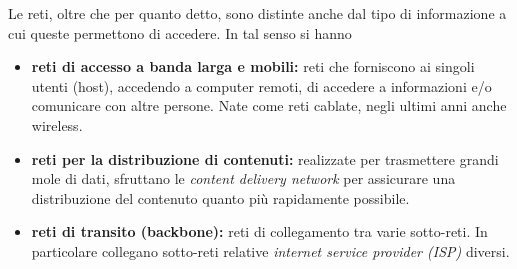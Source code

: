 \documentclass{subfiles}
\begin{document}
Le reti, oltre che per quanto detto, sono distinte anche dal tipo di informazione a cui queste permettono di accedere.
In tal senso si hanno
\begin{itemize}
    \item \textbf{reti di accesso a banda larga e mobili:} reti che forniscono ai singoli utenti (host), accedendo a computer remoti,
          di accedere a informazioni e/o comunicare con altre persone. Nate come reti cablate, negli ultimi anni anche wireless.

    \item \textbf{reti per la distribuzione di contenuti:} realizzate per trasmettere grandi mole di dati,
          sfruttano le \emph{content delivery network} per assicurare una distribuzione del contenuto quanto più rapidamente possibile.

    \item \textbf{reti di transito (backbone):} reti di collegamento tra varie sotto-reti.
          In particolare collegano sotto-reti relative \emph{internet service provider (ISP)} diversi.
\end{itemize}
\end{document}
